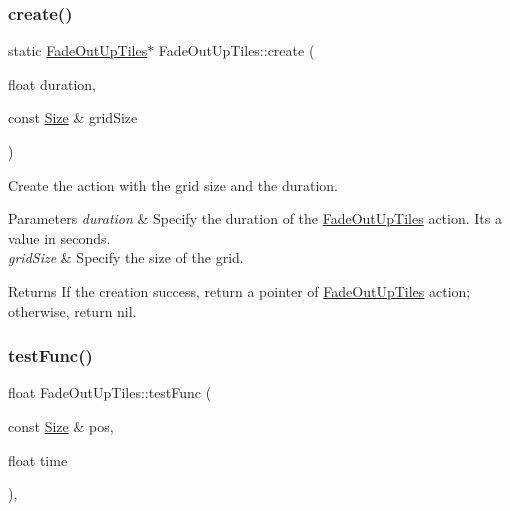 \subsubsection{\texorpdfstring{create()}{create()}\hspace{0.1cm}{\footnotesize\ttfamily [2/2]}}
{\footnotesize\ttfamily static \hyperlink{classFadeOutUpTiles}{Fade\+Out\+Up\+Tiles}$\ast$ Fade\+Out\+Up\+Tiles\+::create (\begin{DoxyParamCaption}\item[{float}]{duration,  }\item[{const \hyperlink{classSize}{Size} \&}]{grid\+Size }\end{DoxyParamCaption})\hspace{0.3cm}{\ttfamily [static]}}



Create the action with the grid size and the duration. 


\begin{DoxyParams}{Parameters}
{\em duration} & Specify the duration of the \hyperlink{classFadeOutUpTiles}{Fade\+Out\+Up\+Tiles} action. It\textquotesingle{}s a value in seconds. \\
\hline
{\em grid\+Size} & Specify the size of the grid. \\
\hline
\end{DoxyParams}
\begin{DoxyReturn}{Returns}
If the creation success, return a pointer of \hyperlink{classFadeOutUpTiles}{Fade\+Out\+Up\+Tiles} action; otherwise, return nil. 
\end{DoxyReturn}
\mbox{\label{classFadeOutUpTiles_a8a0a0c36e5c02a518dc649b2ec7d8864}} 
\subsubsection{\texorpdfstring{test\+Func()}{testFunc()}\hspace{0.1cm}{\footnotesize\ttfamily [1/2]}}
{\footnotesize\ttfamily float Fade\+Out\+Up\+Tiles\+::test\+Func (\begin{DoxyParamCaption}\item[{const \hyperlink{classSize}{Size} \&}]{pos,  }\item[{float}]{time }\end{DoxyParamCaption})\hspace{0.3cm}{\ttfamily [override]}, {\ttfamily [virtual]}}



